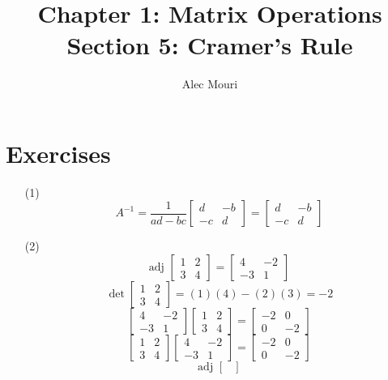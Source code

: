 \documentclass[12pt]{article}
\begin{document}
\title{Chapter 1: Matrix Operations \\ Section 5: Cramer's Rule}
\author{Alec Mouri}

\maketitle
\section*{Exercises}
\begin{itemize}
\item[(1)]
$$A^{-1} = \frac{1}{ad - bc}\begin{bmatrix}
d & -b \\
-c & d
\end{bmatrix} = \begin{bmatrix}
d & -b \\
-c & d
\end{bmatrix}$$
\item[(2)]
$$\text{adj }\begin{bmatrix}
1 & 2 \\
3 & 4
\end{bmatrix} = \begin{bmatrix}
4 & -2 \\
-3 & 1
\end{bmatrix}$$
$$\det\begin{bmatrix}
1 & 2 \\
3 & 4
\end{bmatrix} = (1)(4) - (2)(3) = -2$$
$$\begin{bmatrix}
4 & -2 \\
-3 & 1
\end{bmatrix}\begin{bmatrix}
1 & 2 \\
3 & 4
\end{bmatrix} = \begin{bmatrix}
-2 & 0 \\
0 & -2
\end{bmatrix}$$
$$\begin{bmatrix}
1 & 2 \\
3 & 4
\end{bmatrix}\begin{bmatrix}
4 & -2 \\
-3 & 1
\end{bmatrix} = \begin{bmatrix}
-2 & 0 \\
0 & -2
\end{bmatrix}$$
$$\text{adj }\begin{bmatrix}

\end{bmatrix}$$
\end{itemize}
\end{document}
